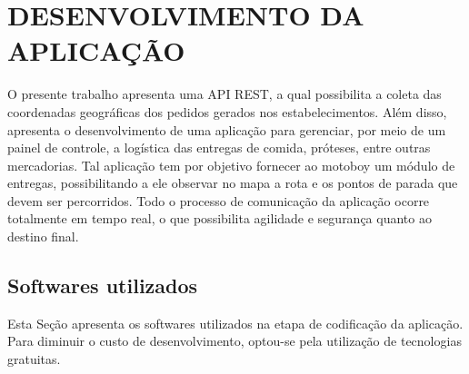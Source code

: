 \chapter{DESENVOLVIMENTO DA APLICAÇÃO}

O presente trabalho apresenta uma API REST, a qual possibilita a coleta das coordenadas geográficas dos pedidos gerados nos estabelecimentos. Além disso, apresenta o desenvolvimento de uma aplicação para gerenciar, por meio de um painel de controle, a logística das entregas de comida, próteses, entre outras mercadorias. Tal aplicação tem por objetivo fornecer ao motoboy um módulo de entregas, possibilitando a ele observar no mapa a rota e os pontos de parada que devem ser percorridos. Todo o processo de comunicação da aplicação ocorre totalmente em tempo real, o que possibilita agilidade e segurança quanto ao destino final.

\section{Softwares utilizados}

Esta Seção apresenta os softwares utilizados na etapa de codificação da aplicação. Para diminuir o custo de desenvolvimento, optou-se pela utilização de tecnologias gratuitas. 

